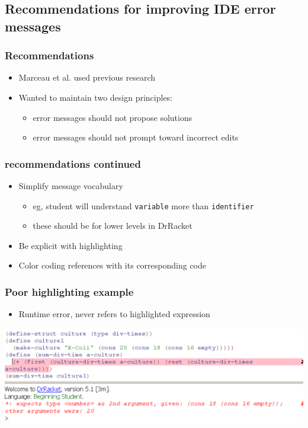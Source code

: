 \documentclass{beamer}
\begin{document}
\subsection[DrRacket recommendations]{Recommendations for improving IDE error messages}

\begin{frame}
	\frametitle{Recommendations}
		\begin{itemize}
			\item Marceau et al. used previous research
			\item Wanted to maintain two design principles:
			\begin{itemize}
				\item error messages should not propose solutions
				\item error messages should not prompt toward incorrect edits
			\end{itemize}
		\end{itemize}

\end{frame}

\begin{frame}[fragile]
	\frametitle{recommendations continued}
		\begin{itemize}
			\item Simplify message vocabulary
				\begin{itemize}
					\item eg, student will understand \texttt{variable} more than \texttt{identifier}
					\item these should be for lower levels in DrRacket
				\end{itemize}
			\item Be explicit with highlighting
			\item Color coding references with its corresponding code
		\end{itemize}

\end{frame}

\begin{frame}
	\frametitle{Poor highlighting example}
	\begin{itemize}
		\item Runtime error, never refers to highlighted expression
	\end{itemize}
		\includegraphics[keepaspectratio, width=0.95\paperwidth]{DrRacketNoClearReferent.pdf}
		\\
\end{frame}
\end{document}

